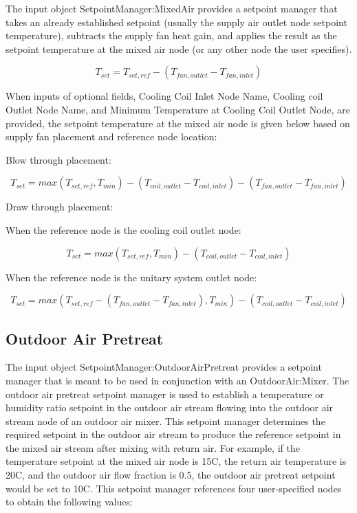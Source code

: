 The input object SetpointManager:MixedAir provides a setpoint manager that takes an already established setpoint (usually the supply air outlet node setpoint temperature), subtracts the supply fan heat gain, and applies the result as the setpoint temperature at the mixed air node (or any other node the user specifies).

\begin{equation}
{T_{set}} = {T_{set,ref}} - ({T_{fan,outlet}} - {T_{fan,inlet}})
\end{equation}

When inputs of optional fields, Cooling Coil Inlet Node Name, Cooling coil Outlet Node Name, and Minimum Temperature at Cooling Coil Outlet Node, are provided, the setpoint temperature at the mixed air node is given below based on supply fan placement and reference node location:

Blow through placement:

\begin{equation}
{T_{set}} = max(T_{set,ref}, T_{min}) - ({T_{coil,outlet}} - {T_{coil,inlet}}) - ({T_{fan,outlet}} - {T_{fan,inlet}})
\end{equation}

Draw through placement:

When the reference node is the cooling coil outlet node:

\begin{equation}
{T_{set}} = max(T_{set,ref}, T_{min}) - ({T_{coil,outlet}} - {T_{coil,inlet}})
\end{equation}

When the reference node is the unitary system outlet node:

\begin{equation}
{T_{set}} = max(T_{set,ref} - ({T_{fan,outlet}} - {T_{fan,inlet}}), T_{min}) - ({T_{coil,outlet}} - {T_{coil,inlet}})
\end{equation}

\subsection{Outdoor Air Pretreat}\label{outdoor-air-pretreat}

The input object SetpointManager:OutdoorAirPretreat provides a setpoint manager that is meant to be used in conjunction with an OutdoorAir:Mixer. The outdoor air pretreat setpoint manager is used to establish a temperature or humidity ratio setpoint in the outdoor air stream flowing into the outdoor air stream node of an outdoor air mixer. This setpoint manager determines the required setpoint in the outdoor air stream to produce the reference setpoint in the mixed air stream after mixing with return air. For example, if the temperature setpoint at the mixed air node is 15C, the return air temperature is 20C, and the outdoor air flow fraction is 0.5, the outdoor air pretreat setpoint would be set to 10C. This setpoint manager references four user-specified nodes to obtain the following values:

